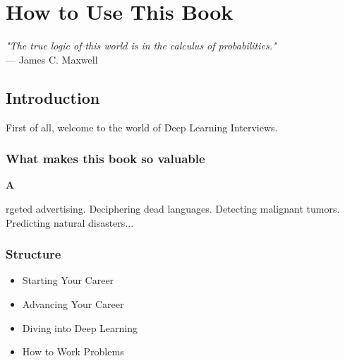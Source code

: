 \documentclass[11pt]{book}
\newcommand{\initialbox}[1]{%
  \fboxsep=0pt
  \colorbox{chaptercolor!30}{\parbox[c][1.5em][c]{1.5em}{\centering\color{chaptercolor}\Large\textbf{#1}}}%
}
\begin{document}
\chapter{How to Use This Book}

\begin{flushright}
\textit{"The true logic of this world is in the calculus of probabilities."}\\
--- James C. Maxwell
\end{flushright}

\tableofcontents

\section{Introduction}
First of all, welcome to the world of Deep Learning Interviews.

\subsection{What makes this book so valuable}

\initialbox{A}rgeted advertising. Deciphering dead languages. Detecting malignant tumors. Predicting natural disasters... \lipsum[2]

\subsection{Structure}
\begin{itemize}[label=\textbullet]
    \item Starting Your Career
    \item Advancing Your Career
    \item Diving into Deep Learning
    \item How to Work Problems
\end{itemize}
\end{document}
